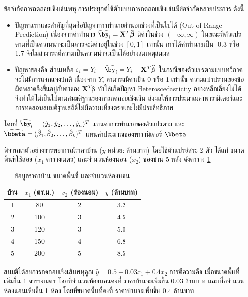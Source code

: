 \begin{myLimit}[]{ข้อจำกัดการถดถอยเชิงเส้นพหุ}{} การประยุกต์ใช้ตัวแบบการถดถอยเชิงเส้นมีข้อจำกัดหลายประการ ดังนี้
	
	\begin{itemize}
		\item ปัญหาแรกและสำคัญที่สุดคือปัญหาการทำนายค่านอกช่วงที่เป็นไปได้ (Out-of-Range Prediction) เนื่องจากค่าทำนาย $\widehat{\by}_i = \mathbf{X}^{T} \widehat{\boldsymbol{\beta}}$ มีค่าในช่วง $(-\infty, \infty)$ ในขณะที่ตัวแปรตามที่เป็นความน่าจะเป็นควรจะมีค่าอยู่ในช่วง $[0, 1]$ เท่านั้น การได้ค่าทำนายเป็น -0.3 หรือ 1.7 จึงไม่สามารถตีความเป็นความน่าจะเป็นได้อย่างสมเหตุสมผล
		
		\item ปัญหาสองคือ ส่วนเหลือ  $\varepsilon_i = Y_i - \widehat{\by}_i = Y_i -  \mathbf{X}^{T} \widehat{\boldsymbol{\beta}}$ ในกรณีของตัวแปรตามแบบทวิภาคจะไม่มีการแจกแจงปกติ เนื่องจาก $Y_i$ สามารถมีค่าเป็น 0 หรือ 1 เท่านั้น ความแปรปรวนของข้อผิดพลาดจึงขึ้นอยู่กับค่าของ $\mathbf{X}^{T} \boldsymbol{\beta}$ ทำให้เกิดปัญหา Heteroscedasticity อย่างหลีกเลี่ยงไม่ได้ จึงทำให้ไม่เป็นไปตามสมมติฐานของการถดถอยเชิงเส้น ส่งผลให้การประมาณค่าพารามิเตอร์และการทดสอบสมมติฐานสถิติไม่มีความเที่ยงตรงและไม่มีประสิทธิภาพ
	\end{itemize}
	โดยที่ $\widehat{\by}_i=(\hat{y}_{1}, \hat{y}_{2}, \ldots, \hat{y}_{n})^T$ แทนค่าการทำนายของตัวแปรตาม และ $\widehat{\bbeta}=(\hat{\beta}_{1}, \hat{\beta}_{2}, \ldots, \hat{\beta}_{k})^T$
	แทนค่าประมาณของพารามิเตอร์ $\bbeta$
\end{myLimit}

\begin{exmp}
\label{exmp:multiple_linear_regression_housing}
พิจารณาตัวอย่างการพยากรณ์ราคาบ้าน ($y$ หน่วย: ล้านบาท) โดยใช้ตัวแปรอิสระ 2 ตัว ได้แก่ ขนาดพื้นที่ใช้สอย ($x_1$ ตารางเมตร) และจำนวนห้องนอน ($x_2$) ของบ้าน 5 หลัง ดังตาราง \ref{tab:housing_data}

\begin{table}[h!]
\centering
\caption{ข้อมูลราคาบ้าน ขนาดพื้นที่ และจำนวนห้องนอน}
\label{tab:housing_data}
\begin{tabular}{|c|c|c|c|}
\hline
\textbf{บ้าน} & $x_1$ (ตร.ม.) & $x_2$ (ห้องนอน) & $y$ (ล้านบาท) \\ \hline
1 & 80 & 2 & 3.2 \\ \hline
2 & 100 & 3 & 4.5 \\ \hline
3 & 120 & 3 & 5.0 \\ \hline
4 & 150 & 4 & 6.8 \\ \hline
5 & 200 & 5 & 8.5 \\ \hline
\end{tabular}
\end{table}

สมมติได้สมการถดถอยเชิงเส้นพหุคูณ $\hat{y} = 0.5 + 0.03x_1 + 0.4x_2$ การตีความคือ เมื่อขนาดพื้นที่เพิ่มขึ้น 1 ตารางเมตร โดยที่จำนวนห้องนอนคงที่ ราคาบ้านจะเพิ่มขึ้น 0.03 ล้านบาท และเมื่อจำนวนห้องนอนเพิ่มขึ้น 1 ห้อง โดยที่ขนาดพื้นที่คงที่ ราคาบ้านจะเพิ่มขึ้น 0.4 ล้านบาท
\end{exmp}


